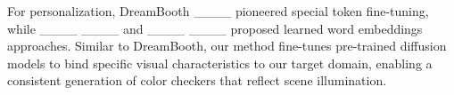 \vspace{3pt}  
% 
For personalization, DreamBooth ____ pioneered special token fine-tuning, while ____ ____ and ____ ____ proposed learned word embeddings approaches. Similar to DreamBooth, our method fine-tunes pre-trained diffusion models to bind specific visual characteristics to our target domain, enabling a consistent generation of color checkers that reflect scene illumination.
